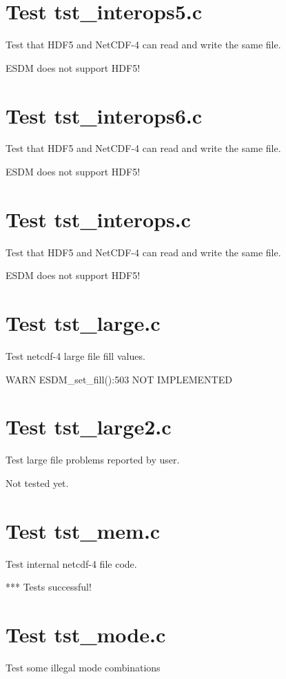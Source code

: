 \section{Test tst\_interops5.c}

Test that HDF5 and NetCDF-4 can read and write the same file.

ESDM does not support HDF5!

\section{Test tst\_interops6.c}

Test that HDF5 and NetCDF-4 can read and write the same file.

ESDM does not support HDF5!

\section{Test tst\_interops.c}

Test that HDF5 and NetCDF-4 can read and write the same file.

ESDM does not support HDF5!

\section{Test tst\_large.c}

Test netcdf-4 large file fill values.

WARN ESDM\_set\_fill():503 NOT IMPLEMENTED

\section{Test tst\_large2.c}

Test large file problems reported by user.

Not tested yet.

\section{Test tst\_mem.c}

Test internal netcdf-4 file code.

*** Tests successful!

\section{Test tst\_mode.c}

Test some illegal mode combinations

